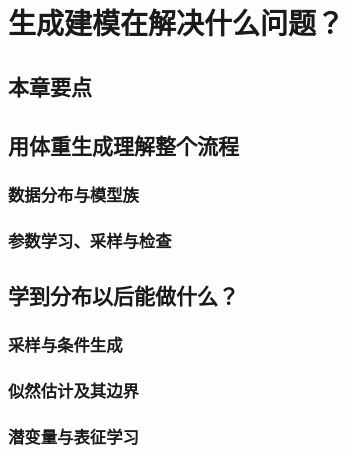 \chapter{生成建模在解决什么问题？}
\label{chap:intro}

\section*{本章要点}
\contentplaceholder

\section{用体重生成理解整个流程}
\label{sec:intro-workflow}
\contentplaceholder

\subsection{数据分布与模型族}
\label{subsec:intro-distribution}
\contentplaceholder

\subsection{参数学习、采样与检查}
\label{subsec:intro-learning-sampling}
\contentplaceholder

\section{学到分布以后能做什么？}
\label{sec:intro-applications}
\contentplaceholder

\subsection{采样与条件生成}
\label{subsec:intro-sampling}
\contentplaceholder

\subsection{似然估计及其边界}
\label{subsec:intro-likelihood}
\contentplaceholder

\subsection{潜变量与表征学习}
\label{subsec:intro-representation}
\contentplaceholder

